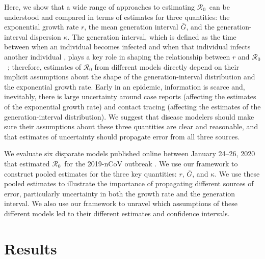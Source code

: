 \documentclass[12pt]{article}
\newcommand{\Rx}[1]{\ensuremath{{\mathcal R}_{#1}}}
\newcommand{\Ro}{\Rx{0}\xspace}
\begin{document}
Here, we show that a wide range of approaches to estimating \Ro\ can be understood and compared in terms of estimates for three quantities: the exponential growth rate $r$, the mean generation interval $\bar G$, and the generation-interval dispersion $\kappa$.
The generation interval, which is defined as the time between when an individual becomes infected and when that individual infects another individual \citep{svensson2007note}, plays a key role in shaping the relationship between $r$ and \Ro\ \citep{wearing2005appropriate, roberts2007model, wallinga2007generation, park2019practical};
therefore, estimates of $\mathcal R_0$ from different models directly depend on their implicit assumptions about the shape of the generation-interval distribution and the exponential growth rate.
Early in an epidemic, information is scarce and, inevitably, there is large uncertainty around case reports (affecting the estimates of the exponential growth rate) and contact tracing (affecting the estimates of the generation-interval distribution).
We suggest that disease modelers should make sure their assumptions about these three quantities are clear and reasonable, and that estimates of uncertainty should propagate error from all three sources.

We evaluate six disparate models published online between January 24--26, 2020 that estimated \Ro\ for the 2019-nCoV outbreak \citep{imaincov, liuncov, majumderncov, readncov, riouncov, zhaoncov}. 
We use our framework to construct pooled estimates for the three key quantities: $r$, $\bar G$, and $\kappa$. 
We use these pooled estimates to illustrate the importance of propagating different sources of error, particularly uncertainty in both the growth rate and the generation interval. 
We also use our framework to unravel which assumptions of these different models led to their different estimates and confidence intervals.

\section{Results}
\end{document}
